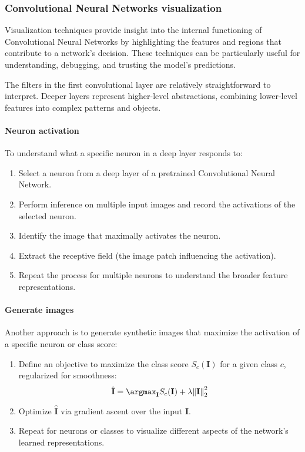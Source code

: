 \subsubsection{Convolutional Neural Networks visualization}
Visualization techniques provide insight into the internal functioning of Convolutional Neural Networks by highlighting the features and regions that contribute to a network's decision. 
These techniques can be particularly useful for understanding, debugging, and trusting the model's predictions.

The filters in the first convolutional layer are relatively straightforward to interpret. 
Deeper layers represent higher-level abstractions, combining lower-level features into complex patterns and objects.

\paragraph*{Neuron activation}
To understand what a specific neuron in a deep layer responds to:
\begin{enumerate}
    \item Select a neuron from a deep layer of a pretrained Convolutional Neural Network.
    \item Perform inference on multiple input images and record the activations of the selected neuron.
    \item Identify the image that maximally activates the neuron.
    \item Extract the receptive field (the image patch influencing the activation).
    \item Repeat the process for multiple neurons to understand the broader feature representations.
\end{enumerate}

\paragraph*{Generate images}
Another approach is to generate synthetic images that maximize the activation of a specific neuron or class score:
\begin{enumerate}
    \item Define an objective to maximize the class score $S_c(\mathbf{I})$ for a given class $c$, regularized for smoothness:
        \[\hat{\mathbf{I}}=\argmax_\mathbf{I} S_c(\mathbf{I})+\lambda{\left\lVert \mathbf{I}\right\rVert}_2^2 \]
    \item Optimize $\hat{\mathbf{I}}$ via gradient ascent over the input $\mathbf{I}$. 
    \item Repeat for neurons or classes to visualize different aspects of the network's learned representations.
\end{enumerate}

